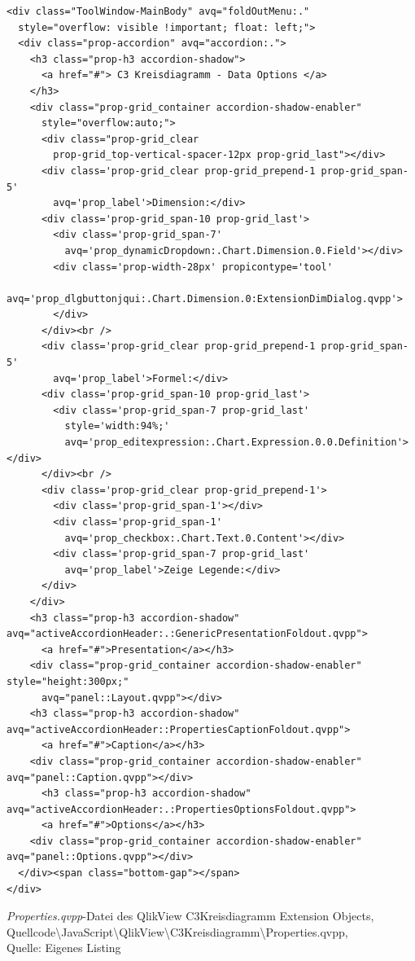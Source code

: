 \begin{appendix}
\ifIncludeFigures\begin{listing}[htbp]
\begin{verbatim}
<div class="ToolWindow-MainBody" avq="foldOutMenu:."
  style="overflow: visible !important; float: left;">
  <div class="prop-accordion" avq="accordion:.">
    <h3 class="prop-h3 accordion-shadow">
      <a href="#"> C3 Kreisdiagramm - Data Options </a>
    </h3>
    <div class="prop-grid_container accordion-shadow-enabler"
      style="overflow:auto;">
      <div class="prop-grid_clear 
        prop-grid_top-vertical-spacer-12px prop-grid_last"></div>
      <div class='prop-grid_clear prop-grid_prepend-1 prop-grid_span-5'
        avq='prop_label'>Dimension:</div>
      <div class='prop-grid_span-10 prop-grid_last'>
        <div class='prop-grid_span-7' 
          avq='prop_dynamicDropdown:.Chart.Dimension.0.Field'></div>
        <div class='prop-width-28px' propicontype='tool'
          avq='prop_dlgbuttonjqui:.Chart.Dimension.0:ExtensionDimDialog.qvpp'>
        </div>
      </div><br />
      <div class='prop-grid_clear prop-grid_prepend-1 prop-grid_span-5'
        avq='prop_label'>Formel:</div>
      <div class='prop-grid_span-10 prop-grid_last'>
        <div class='prop-grid_span-7 prop-grid_last'
          style='width:94%;' 
          avq='prop_editexpression:.Chart.Expression.0.0.Definition'></div>
      </div><br />
      <div class='prop-grid_clear prop-grid_prepend-1'>
        <div class='prop-grid_span-1'></div>
        <div class='prop-grid_span-1' 
          avq='prop_checkbox:.Chart.Text.0.Content'></div>
        <div class='prop-grid_span-7 prop-grid_last'
          avq='prop_label'>Zeige Legende:</div>
      </div>
    </div>
    <h3 class="prop-h3 accordion-shadow" avq="activeAccordionHeader:.:GenericPresentationFoldout.qvpp">
      <a href="#">Presentation</a></h3>
    <div class="prop-grid_container accordion-shadow-enabler" style="height:300px;"
      avq="panel::Layout.qvpp"></div>
    <h3 class="prop-h3 accordion-shadow" avq="activeAccordionHeader::PropertiesCaptionFoldout.qvpp">
      <a href="#">Caption</a></h3>
    <div class="prop-grid_container accordion-shadow-enabler" avq="panel::Caption.qvpp"></div>
      <h3 class="prop-h3 accordion-shadow" avq="activeAccordionHeader:.:PropertiesOptionsFoldout.qvpp">
      <a href="#">Options</a></h3>
    <div class="prop-grid_container accordion-shadow-enabler" avq="panel::Options.qvpp"></div>
  </div><span class="bottom-gap"></span>
</div>
\end{verbatim}
\caption[\textit{Properties.qvpp}-Datei des QlikView C3Kreisdiagramm Extension Objects]{\textit{Properties.qvpp}-Datei des QlikView C3Kreisdiagramm Extension Objects, Quellcode\textbackslash{}JavaScript\textbackslash{}QlikView\textbackslash{}C3Kreisdiagramm\textbackslash{}Properties.qvpp, \\Quelle: Eigenes Listing}
\label{lst:QlikViewJavascriptC3KreisdiagrammSkript}
\end{listing}\fi


\end{appendix}
